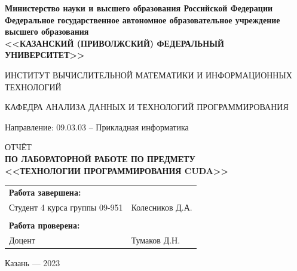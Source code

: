 \documentclass[a4paper,article]{article}
\begin{document}
    \begin{titlepage}
        \begin{center}
            {\bfseries Министерство науки и высшего образования Российской Федерации \\
            Федеральное государственное автономное образовательное учреждение \\
            высшего образования \\
            <<КАЗАНСКИЙ (ПРИВОЛЖСКИЙ) ФЕДЕРАЛЬНЫЙ УНИВЕРСИТЕТ>>}
        \end{center}

        \begin{center}
            ИНСТИТУТ ВЫЧИСЛИТЕЛЬНОЙ МАТЕМАТИКИ И ИНФОРМАЦИОННЫХ ТЕХНОЛОГИЙ
        \end{center}

        \begin{center}
            КАФЕДРА АНАЛИЗА ДАННЫХ И ТЕХНОЛОГИЙ ПРОГРАММИРОВАНИЯ
        \end{center}

        \begin{center}
            Направление: 09.03.03 – Прикладная информатика
        \end{center}

        \vspace{1cm}

        \begin{center}
            ОТЧЁТ \\
            {\bfseries ПО ЛАБОРАТОРНОЙ РАБОТЕ ПО ПРЕДМЕТУ\\
            <<ТЕХНОЛОГИИ ПРОГРАММИРОВАНИЯ CUDA>>}
        \end{center}

        \vfill

        \begin{xltabular}{\textwidth} {
                >{\hsize} X
                >{\hsize} X }
            \bfseries{Работа завершена:} & \\
            Студент 4 курса группы 09-951 & \hspace{2cm}Колесников Д.А.\\
            & \\
            \bfseries{Работа проверена:} & \\
            Доцент & \hspace{2cm}Тумаков Д.Н. \\
        \end{xltabular}

        \vspace{0mm}

        \begin{center}
            Казань — 2023
        \end{center}
    \end{titlepage}
\end{document}
